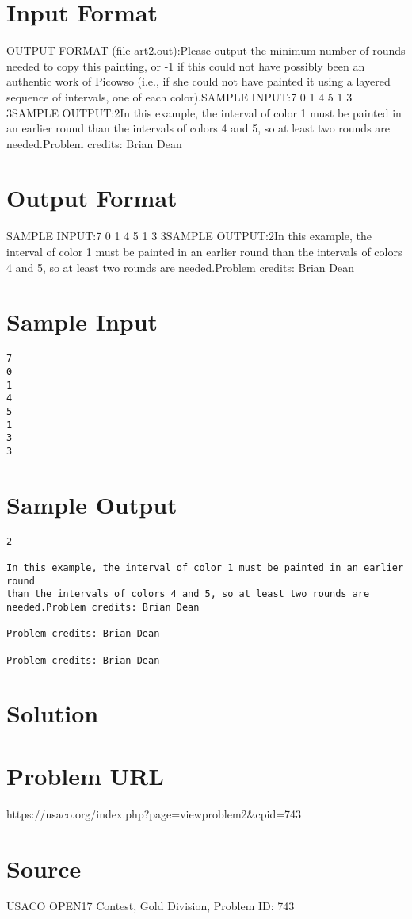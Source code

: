 \documentclass[12pt]{article}
\begin{document}
\section*{Input Format}
OUTPUT FORMAT (file art2.out):Please output the minimum number of rounds needed to copy this painting, or -1
if this could not have possibly been an authentic work of Picowso (i.e., if she
could not have painted it using a layered sequence of intervals, one of each
color).SAMPLE INPUT:7
0
1
4
5
1
3
3SAMPLE OUTPUT:2In this example, the interval of color 1 must be painted in an earlier round
than the intervals of colors 4 and 5, so at least two rounds are needed.Problem credits: Brian Dean

\section*{Output Format}
SAMPLE INPUT:7
0
1
4
5
1
3
3SAMPLE OUTPUT:2In this example, the interval of color 1 must be painted in an earlier round
than the intervals of colors 4 and 5, so at least two rounds are needed.Problem credits: Brian Dean

\section*{Sample Input}
\begin{verbatim}
7
0
1
4
5
1
3
3
\end{verbatim}

\section*{Sample Output}
\begin{verbatim}
2

In this example, the interval of color 1 must be painted in an earlier round
than the intervals of colors 4 and 5, so at least two rounds are needed.Problem credits: Brian Dean

Problem credits: Brian Dean

Problem credits: Brian Dean
\end{verbatim}

\section*{Solution}


\section*{Problem URL}
https://usaco.org/index.php?page=viewproblem2&cpid=743

\section*{Source}
USACO OPEN17 Contest, Gold Division, Problem ID: 743
\end{document}
